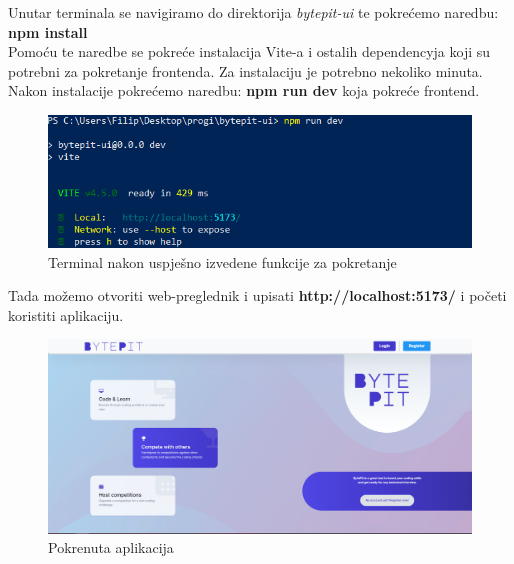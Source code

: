 			\noindent Unutar terminala se navigiramo do direktorija \textit{bytepit-ui} te pokrećemo naredbu: \textbf{npm install}\\
			Pomoću te naredbe se pokreće instalacija Vite-a i ostalih dependencyja koji su potrebni za pokretanje frontenda. Za instalaciju je potrebno nekoliko minuta.\\
			\noindent Nakon instalacije pokrećemo naredbu: \textbf{npm run dev} koja pokreće frontend.
			\begin{figure}[H]
				\includegraphics[scale=0.9]{slike/vite.PNG} 
				\centering
				\caption{Terminal nakon uspješno izvedene funkcije za pokretanje}
				\label{fig:vite}
			\end{figure}
			\noindent Tada možemo otvoriti web-preglednik i upisati \textbf{http://localhost:5173/} i početi koristiti aplikaciju.\\
			\begin{figure}[H]
				\includegraphics[scale=0.4]{slike/bytepit.PNG} 
				\centering
				\caption{Pokrenuta aplikacija}
				\label{fig:bytepit}
			\end{figure}
			